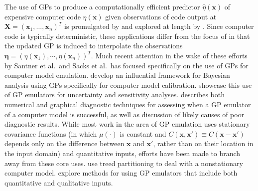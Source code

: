 \documentclass{article}
\begin{document}
The use of GPs to produce a computationally efficient predictor $\hat \eta (\mathbf x)$ of expensive computer code $\eta(\mathbf x)$ given observations of code output at $\mathbf X=(\mathbf x_1,\ldots,\mathbf x_n)^T$ is promulgated by \cite{Sacks1989} and explored at length by \cite{Santner2003a}. Since computer code is typically deterministic, these applications differ from the focus of \cite{OHagan1978} in that the updated GP is induced to interpolate the observations $\boldsymbol \eta = (\eta(\mathbf x_1),\cdots,\eta(\mathbf x_n))^T$. Much recent attention in the wake of these efforts by Santner et al.\ and Sacks et al.\  has focused specifically on the use of GPs for computer model emulation.
\cite{Kennedy2001} develop an influential framework for Bayesian analysis using GPs specifically for computer model calibration. \cite{Kennedy2006} showcase this use of GP emulators for uncertainty and sensitivity analyses. \cite{Bastos2009} describes both numerical and graphical diagnostic techniques for assessing when a GP emulator of a computer model is successful, as well as discussion of likely causes of poor diagnostic results. While most work in the area of GP emulation uses stationary covariance functions (in which $\mu(\cdot)$ is constant and $C(\mathbf x,\mathbf x' )\equiv C(\mathbf x-\mathbf x' )$ depends only on the difference between $\mathbf x$ and $\mathbf x'$, rather than on their location in the input domain) and quantitative inputs, efforts have been made to branch away from these core uses. \cite{Gramacy2008} use treed partitioning to deal with a nonstationary computer model. \cite{Qian2008} explore methods for using GP emulators that include both quantitative and qualitative inputs.
\end{document}
